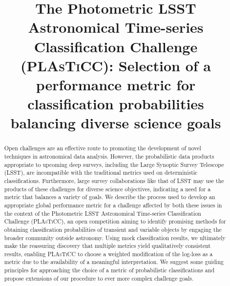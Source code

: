 \documentclass[\docopts]{\docclass}
\begin{document}
\linenumbers

\title{The Photometric \textsc{LSST} Astronomical Time-series Classification Challenge (\textsc{PLAsTiCC}): Selection of a performance metric for classification probabilities balancing diverse science goals}

\maketitlepre

\begin{abstract}

  Open challenges are an effective route to promoting the development of novel techniques in astronomical data analysis.
  However, the probabilistic data products appropriate to upcoming deep surveys, including the Large Synoptic Survey Telescope (\textsc{LSST}), are incompatible with the traditional metrics used on deterministic classifications.
  Furthermore, large survey collaborations like that of \textsc{LSST} may use the products of these challenges for diverse science objectives, indicating a need for a metric that balances a variety of goals.
  We describe the process used to develop an appropriate global performance metric for a challenge affected by both these issues in the context of the Photometric \textsc{LSST} Astronomical Time-series Classification Challenge (\textsc{PLAsTiCC}), an open competition aiming to identify promising methods for obtaining classification probabilities of transient and variable objects by engaging the broader community outside astronomy.
  Using mock classification results, we ultimately make the reassuring discovery that multiple metrics yield qualitatively consistent results, enabling \textsc{PLAsTiCC} to choose a weighted modification of the log-loss as a metric due to the availability of a meaningful interpretation.
  We suggest some guiding principles for approaching the choice of a metric of probabilistic classifications and propose extensions of our procedure to ever more complex challenge goals.

\end{abstract}

\dockeys{}

\maketitlepost









\end{document}
